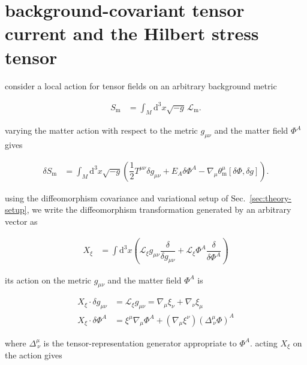 \section{background-covariant tensor current and the Hilbert stress tensor}\label{app:matter-diffeomorphism-current}

consider a local action for tensor fields on an arbitrary background metric

\begin{align}
S_{\mathrm{m}} & =\int _{M}\mathrm{d}^{3}x\sqrt{-g}\,\mathcal{L}_{\mathrm{m}}.
\end{align}

varying the matter action with respect to the metric $\displaystyle{g_{\mu \nu}}$ and the matter field $\displaystyle{\Phi ^{A}}$ gives

\begin{align}
\delta S_{\mathrm{m}} & =\int _{M}\mathrm{d}^{3}x\sqrt{-g}\left(\dfrac{1}{2}T^{\mu \nu}\delta g_{\mu \nu}+E_{A}\delta \Phi ^{A}-\nabla _{\mu}\theta _{\mathrm{m}}^{\mu}[\delta \Phi,\delta g]\right).
\end{align}

using the diffeomorphism covariance and variational setup of Sec.~\ref{sec:theory-setup}, we write the diffeomorphism transformation generated by an arbitrary vector as

\begin{align}
X_{\xi} & =\int \mathrm{d}^{3}x \left( \mathcal{L}_{\xi}g_{\mu \nu} \dfrac{\delta}{\delta g_{\mu \nu}}+ \mathcal{L}_{\xi}\Phi ^{A} \dfrac{\delta}{\delta \Phi ^{A}} \right)
\end{align}

its action on the metric $\displaystyle{g_{\mu \nu}}$ and the matter field $\displaystyle{\Phi ^{A}}$ is

\begin{align}
X_{\xi}\cdot \delta g_{\mu \nu} & =\mathcal{L}_{\xi}g_{\mu \nu}=\nabla _{\mu}\xi _{\nu}+\nabla _{\nu}\xi _{\mu} \\
X_{\xi}\cdot \delta \Phi ^{A} & =\xi ^{\mu}\nabla _{\mu}\Phi ^{A}+(\nabla _{\mu}\xi ^{\nu})(\Delta ^{\mu}_{~\nu}\Phi)^{A}
\end{align}

where $\displaystyle{\Delta ^{\mu}_{~\nu}}$ is the tensor-representation generator appropriate to $\displaystyle{\Phi ^{A}}$. acting $\displaystyle{X_{\xi}}$ on the action gives

